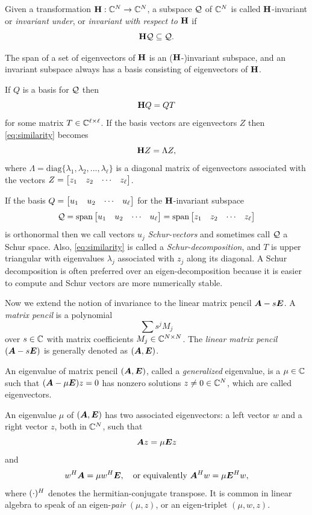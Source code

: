 Given a transformation $\textbf{\textup{H}}:\mathbb{C}^N \rightarrow \mathbb{C}^N$, a subspace $\mathcal{Q}$ of $\mathbb{C}^N$ is called $\textbf{\textup{H}}$-invariant or \emph{invariant under}, or \emph{invariant with respect to} $\textbf{\textup{H}}$ if 
\begin{equation}
\textbf{\textup{H}}\mathcal{Q} \subseteq \mathcal{Q}.
\label{eq:op_invariance}
\end{equation}

The span of a set of eigenvectors of $\textbf{\textup{H}}$ is an ($\textbf{\textup{H}}$-)invariant subspace, and an invariant subspace always has a basis consisting of eigenvectors of $\textbf{\textup{H}}$.   

If $Q$ is a basis for $\mathcal{Q}$ then
\begin{equation}
\textbf{\textup{H}} Q = Q T
\label{eq:similarity}
\end{equation}
for some matrix $T\in\mathbb{C}^{\ell\times\ell}$.  If the basis vectors are eigenvectors $Z$ then \eqref{eq:similarity} becomes
\[
\textbf{\textup{H}} Z = \Lambda Z,
\] 
where $\Lambda = \text{diag} \{ \lambda_1, \lambda_2, ...,\lambda_\ell \}$ is a diagonal matrix of eigenvectors associated with the vectors
 $Z = \begin{bmatrix} z_1 & z_2 & \cdots & z_\ell\end{bmatrix}$. 

If the basis $Q=\begin{bmatrix} u_1 & u_2 & \cdots & u_\ell\end{bmatrix}$ for the $\textbf{\textup{H}}$-invariant subspace 
\[
\mathcal{Q} = \operatorname*{span} \begin{bmatrix} u_1 & u_2 & \cdots & u_\ell\end{bmatrix}=\operatorname*{span} \begin{bmatrix} z_1 & z_2 & \cdots & z_\ell\end{bmatrix}
\] 
is orthonormal then we call vectors $u_j$ \emph{Schur-vectors} and sometimes call $\mathcal{Q}$ a Schur space.   Also, \eqref{eq:similarity} is called a \emph{Schur-decomposition}, and $T$ is upper triangular with eigenvalues $\lambda_j$ associated with $z_j$ along its diagonal.   A Schur decomposition is often preferred over an eigen-decomposition because it is easier to compute and Schur vectors are more numerically stable. 



\medskip
Now we extend the notion of invariance to the linear matrix pencil $\bm{A}-s\bm{E}$.   A \emph{matrix pencil}  is a polynomial
\[
\sum s^j M_j
\]
 over $s\in\mathbb{C}$ with matrix coefficients $M_j\in\mathbb{C}^{N\times N}$.  The \emph{linear matrix pencil} $(\bm{A}- s \bm{E})$  is generally denoted as $(\bm{A},\bm{E})$. 


 An eigenvalue  of  matrix pencil $(\bm{A},\bm{E})$, called  a \emph{generalized} eigenvalue, is a $\mu\in\mathbb{C}$ such that $(\bm{A}-\mu \bm{E})z=0$ has nonzero solutions $z\neq 0\in\mathbb{C}^N$, which are called eigenvectors.

An eigenvalue $\mu$ of $(\bm{A},\bm{E})$ has two associated eigenvectors: a left vector $w$ and a right vector $z$, both in $\mathbb{C}^N$, such that
\[
\bm{A} z = \mu \bm{E} z
\]
and
\[
w^H\bm{A} =\mu w^H\bm{E}, \quad\text{or equivalently } \bm{A}^Hw =\mu \bm{E}^H w,    
\]
where $(\cdot)^H$ denotes the hermitian-conjugate transpose.  It is common in linear algebra to speak of  an eigen-\emph{pair} $(\mu,z)$, or an eigen-triplet  $(\mu,w,z)$. 



